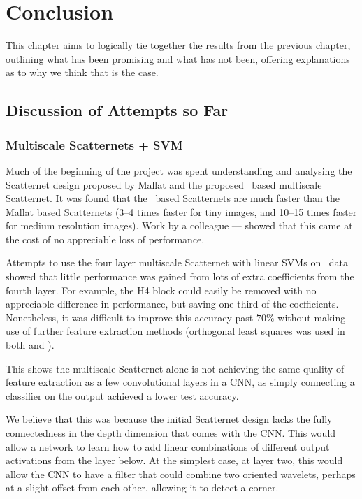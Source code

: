 \chapter{Conclusion}\label{ch:conclusion}
  This chapter aims to logically tie together the results from the previous
  chapter, outlining what has been promising and what has not been, offering
  explanations as to why we think that is the case.

\section{Discussion of Attempts so Far}
\subsection{Multiscale Scatternets + SVM}
  Much of the beginning of the project was spent understanding and analysing the
  Scatternet design proposed by Mallat and the proposed \DTCWT\ based
  multiscale Scatternet. It was found that the \DTCWT\ based Scatternets are
  much faster than the Mallat based Scatternets (3--4 times faster for tiny
  images, and 10--15 times faster for medium resolution images).
  Work by a colleague --- \citet{singh_multi-resolution_2016} showed that this
  came at the cost of no appreciable loss of performance.

  Attempts to use the four layer multiscale Scatternet with linear SVMs on
  \cifar\ data showed that little performance was gained from lots of extra
  coefficients from the fourth layer. For example, the H4 block could easily be
  removed with no appreciable difference in performance, but saving one third
  of the coefficients. Nonetheless, it was difficult to improve this accuracy
  past $70\%$ without making use of further feature extraction methods
  (orthogonal least squares was used in both \citep{oyallon_deep_2015} and
  \citep{singh_multi-resolution_2016}).

  This shows the multiscale Scatternet alone is not achieving
  the same quality of feature extraction  as
  a few convolutional layers in a CNN, as simply connecting a classifier on the
  output achieved a lower test accuracy.

  We believe that this was because the initial Scatternet design lacks the
  fully connectedness in the depth dimension that comes
  with the CNN\@. This would allow a network to learn how to add linear
  combinations of different output activations from the layer below. At the
  simplest case, at layer two, this would allow the CNN to have a filter that
  could combine two oriented wavelets, perhaps at a slight offset from each
  other, allowing it to detect a corner. 

